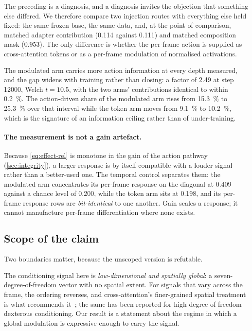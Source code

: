 The preceding is a diagnosis, and a diagnosis invites the objection that
something else differed. We therefore compare two injection routes with
everything else held fixed: the same frozen base, the same data, and, at the
point of comparison, matched adapter contribution (\num{0.114} against
\num{0.111}) and matched composition mask (\num{0.953}). The only difference
is whether the per-frame action is supplied as cross-attention tokens or as
a per-frame modulation of normalised activations.

The modulated arm carries more action information at every depth measured,
and the gap widens with training rather than closing: a factor of
\num{2.49} at step \num{12000}, Welch $t = 10.5$, with the two arms'
contributions identical to within \SI{0.2}{\percent}.
The action-driven share of the modulated arm rises from \SI{15.3}{\percent}
to \SI{25.3}{\percent} over that interval while the token arm moves from
\SI{9.1}{\percent} to \SI{10.2}{\percent}, which is the signature of an
information ceiling rather than of under-training.

\paragraph{The measurement is not a gain artefact.} Because
\cref{eq:effect-rel} is monotone in the gain of the action pathway
(\cref{sec:integrity}), a larger response is by itself compatible with a
louder signal rather than a better-used one. The temporal control separates
them: the modulated arm concentrates its per-frame response on the diagonal
at \num{0.409} against a chance level of \num{0.200}, while the token arm
sits at \num{0.198}, and its per-frame response rows are \emph{bit-identical}
to one another. Gain scales a response; it cannot manufacture per-frame
differentiation where none exists.

\subsection{Scope of the claim}

Two boundaries matter, because the unscoped version is refutable.

The conditioning signal here is \emph{low-dimensional and spatially global}:
a seven-degree-of-freedom vector with no spatial extent. For signals that
vary across the frame, the ordering reverses, and cross-attention's
finer-grained spatial treatment is what recommends
it~\citep{chen2024gentron}; the same has been reported for
high-degree-of-freedom dexterous conditioning. Our result is a statement
about the regime in which a global modulation is expressive enough to carry
the signal.

